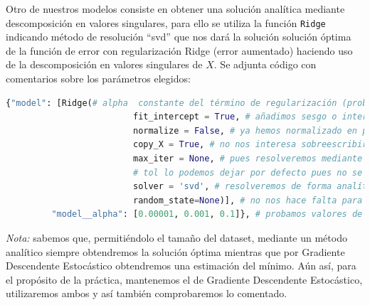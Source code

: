 \documentclass[11pt,a4paper]{article}
\theoremstyle{definition}
\begin{document}
	Otro de nuestros modelos consiste en obtener una solución analítica mediante descomposición en valores singulares, para ello se utiliza la función \texttt{Ridge} indicando método de resolución ``svd'' que nos dará la solución solución óptima de la función de error con regularización Ridge (error aumentado) haciendo uso de la descomposición en valores singulares de $X$. Se adjunta código con comentarios sobre los parámetros elegidos:
	\begin{lstlisting}[language=Python, caption= Par\'ametros usados en \texttt{Ridge}, inputencoding=latin1]
  {"model": [Ridge(# alpha  constante del término de regularización (probaremos distintos valores mediante 5-fold cross validation)
                         fit_intercept = True, # añadimos sesgo o intercept pues nuestra matriz aún no tiene columna de 1s
                         normalize = False, # ya hemos normalizado en preprocesado
                         copy_X = True, # no nos interesa sobreescribir X
                         max_iter = None, # pues resolveremos mediante método analítico
                         # tol lo podemos dejar por defecto pues no se va a usar
                         solver = 'svd', # resolveremos de forma analítica usando descomposición en valores singulares 
                         random_state=None)], # no nos hace falta para tener reproducibilidad de los resultados pues no se va a usar solver=sag o solver=saga. Obtendremos solución analítica
         "model__alpha": [0.00001, 0.001, 0.1]}, # probamos valores de regularización arbitrarios dentro de los recomendados

	\end{lstlisting}
	\textit{Nota:} sabemos que, permitiéndolo el tamaño del dataset, mediante un método analítico siempre obtendremos la solución óptima mientras que por Gradiente Descendente Estocástico obtendremos una estimación del mínimo. Aún así, para el propósito de la práctica, mantenemos el de Gradiente Descendente Estocástico, utilizaremos ambos y así también comprobaremos lo comentado.\\
	
\end{document}
